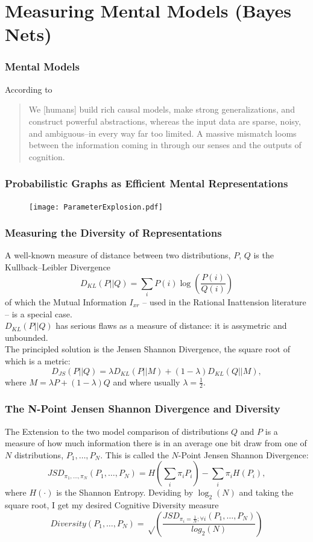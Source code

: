 \documentclass{beamer}
\begin{document}
\section{Measuring Mental Models (Bayes Nets)}
\begin{frame}
\frametitle{Mental Models}
According to \citet{Tenenbaum2011} 
\begin{quote}
We [humans] build rich causal models, make strong generalizations, and construct powerful abstractions, whereas the input data are sparse, noisy, and ambiguous--in every way far too limited. A massive mismatch looms between the information coming in through our senses and the outputs of cognition.
\end{quote}
\end{frame}
\begin{frame}
\frametitle{Probabilistic Graphs as Efficient Mental Representations}
\begin{figure}
  \texttt{[image: ParameterExplosion.pdf]}
\end{figure}
\end{frame}
\begin{frame}
\frametitle{Measuring the Diversity of Representations}
A well-known measure of distance between two distributions, $P$, $Q$ is the Kullback–Leibler Divergence
\begin{equation}
D_{KL}(P || Q)=\sum_i P(i)\log\left(\frac{P(i)}{Q(i)}\right)
\end{equation}
of which the Mutual Information $I_{xr}$ -- used in the Rational Inattension literature -- is a special case.
\\

$D_{KL}(P || Q)$ has serious flaws as a measure of distance: it is assymetric and unbounded. 
\\

The principled solution is the Jensen Shannon Divergence, the square root of which is a metric:
\begin{equation}
D_{JS}(P || Q)= \lambda D_{KL}(P || M) + (1-\lambda) D_{KL}(Q || M), 
\end{equation}
where $M = \lambda P + (1-\lambda)Q$ and where usually $\lambda=\frac{1}{2}$.     
\end{frame} 
\begin{frame}
\frametitle{The N-Point Jensen Shannon Divergence and Diversity}
The Extension to the two model comparison of distributions $Q$ and $P$ is a measure of how much information there is in an average one bit draw from one of $N$ distributions, $P_1, \ldots, P_N$. This is called the $N$-Point Jensen Shannon Divergence:
\begin{equation}
JSD_{\pi_1, \ldots, \pi_N}(P_1, \ldots, P_N)=H\left(\sum_i\pi_iP_i\right)-\sum_i \pi_iH(P_i),
\end{equation} 
where $H(\cdot)$ is the Shannon Entropy. Deviding by $\log_2(N)$ and taking the square root, I get my desired Cognitive Diversity measure
 \begin{equation}
Diversity(P_1, \ldots, P_N)=\sqrt\left(\frac{JSD_{\pi_i=\frac{1}{N}; \forall i}(P_1, \ldots, P_N)}{log_2(N)}\right)
\end{equation} 
\end{frame}
\end{document}
